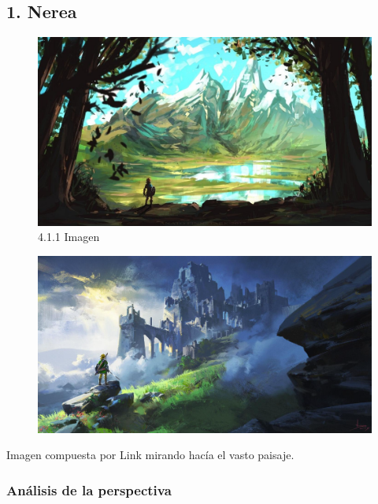 \documentclass[12pt]{article}
\begin{document}
    \subsection{1. Nerea}
    \begin{figure}[H]
      \centering
      \includegraphics[width=\textwidth]{Nerea/1_concept_art.jpg}
      \caption{\small 4.1.1 Imagen}
    \end{figure}

    \begin{figure}[H]
      \centering
      \includegraphics[width=\textwidth]{images/Nerea/6_concept_art.png}
    \end{figure}
    Imagen compuesta por Link mirando hacía el vasto paisaje.

    
        \subsubsection{Análisis de la perspectiva}
\end{document}
